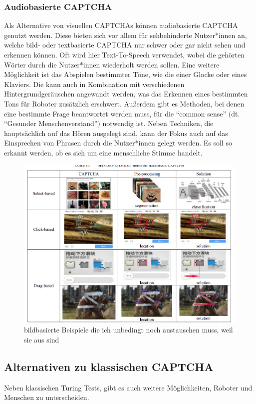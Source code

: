 \subsubsection*{Audiobasierte CAPTCHA}
Als Alternative von visuellen CAPTCHAs können audiobasierte CAPTCHA genutzt werden.
Diese bieten sich vor allem für sehbehinderte Nutzer*innen an, welche bild- oder textbasierte CAPTCHA nur schwer oder gar nicht sehen und erkennen können.
Oft wird hier Text-To-Speech verwendet, wobei die gehörten Wörter durch die Nutzer*innen wiederholt werden sollen.
Eine weitere Möglichkeit ist das Abspielen bestimmter Töne, wie die einer Glocke oder eines Klaviers. 
Die kann auch in Kombination mit verschiedenen Hintergrundgeräuschen angewandt werden, was das Erkennen eines bestimmten Tons für Roboter zusätzlich erschwert.
Außerdem gibt es Methoden, bei denen eine bestimmte Frage beantwortet werden muss, für die ``common sense'' $($dt. ``Gesunder Menschenverstand''$)$ notwendig ist.
Neben Techniken, die hauptsächlich auf das Hören ausgelegt sind, kann der Fokus auch auf das Einsprechen von Phrasen durch die Nutzer*innen gelegt werden.
Es soll so erkannt werden, ob es sich um eine menschliche Stimme handelt.
\cite[p.78]{surveyofresearch}

\begin{figure}
    \centering
    \includegraphics{gfx/mygraphics/unbedingtaustauschen2.png}
    \caption{bildbasierte Beispiele die ich unbedingt noch austauschen muss, weil sie aus \cite{surveyofresearch} sind}
    \label{fig:pr0grammcaptcha}
\end{figure}

\subsection{Alternativen zu klassischen CAPTCHA}
Neben klassischen Turing Tests, gibt es auch weitere Möglichkeiten, Roboter und Menschen zu unterscheiden.

